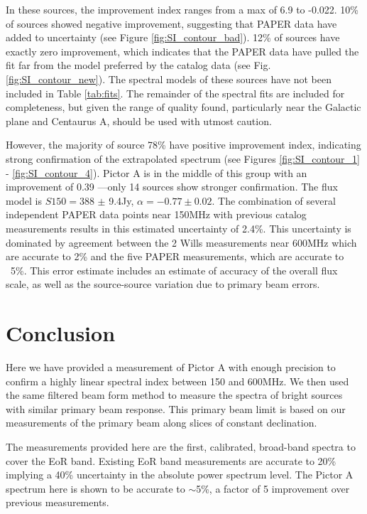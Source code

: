 \documentclass[preprint]{aastex}
\begin{document}
In these sources, the improvement index ranges from a max of 6.9 to -0.022.
10\% of sources showed negative improvement, suggesting that PAPER data have
added to uncertainty (see Figure \ref{fig:SI_contour_bad}). 12\% of sources
have exactly zero improvement, which indicates that the PAPER data have pulled
the fit far from the model preferred by the catalog data (see Fig.
\ref{fig:SI_contour_new}).  The spectral models of these sources have not been
included in Table \ref{tab:fits}.  The remainder of the spectral fits are
included for completeness, but given the range of quality found, particularly
near the Galactic plane and Centaurus A, should be used with utmost caution.

However, the majority of source 78\% have positive improvement index,
indicating strong confirmation of the extrapolated spectrum (see Figures
\ref{fig:SI_contour_1} - \ref{fig:SI_contour_4}).  Pictor A is in the middle of
this group  with an improvement of 0.39 ---only 14 sources show stronger
confirmation.  The flux model is $S150=$388 $\pm$ 9.4Jy, $\alpha=-0.77\pm0.02$.
The combination of several independent PAPER data points near 150MHz with
previous catalog measurements results in this estimated uncertainty of 2.4\%.
This uncertainty is dominated by agreement between the 2 Wills measurements
near 600MHz which are accurate to 2\% and the five PAPER measurements, which
are accurate to ~5\%.  This error estimate includes an estimate of accuracy of the overall flux scale,
as well as the source-source variation due to primary beam errors. 



 \section{Conclusion}
 \label{sec:Conclusion}

Here we have provided a measurement of Pictor A with enough precision to confirm
a highly linear spectral index between 150 and 600MHz. We then used the same
filtered beam form method to measure the spectra of bright sources with similar
primary beam response. This primary beam limit is based on our measurements 
of the primary beam along slices of constant declination.  


The measurements provided
here are the first, calibrated, broad-band spectra to cover the EoR band. Existing EoR band measurements
are accurate to 20\% implying a 40\% uncertainty in the absolute power spectrum
level.  The Pictor A spectrum here is shown to be accurate to 
$\sim$5\%, a factor of 5 improvement over previous measurements.
\end{document}
